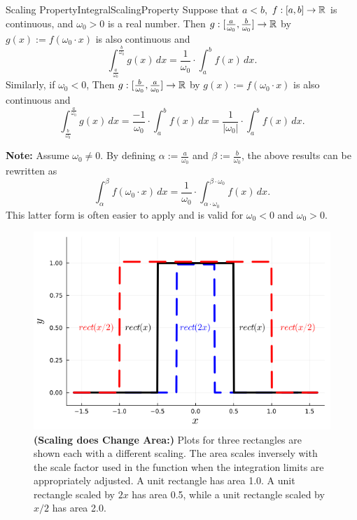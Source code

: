 \begin{propColor}{Scaling Property}{IntegralScalingProperty}
Suppose that $a < b$, $f:[a, b] \to \mathbb R$ is continuous, and $\omega_0 > 0$ is a real number.  Then $g:[\frac{a}{\omega_0}, \frac{b}{\omega_0}] \to \mathbb R$ by $g(x):=f(\omega_0 \cdot x)$ is also continuous and
\begin{equation}
\int_{\frac{a}{\omega_0}}^{\frac{b}{\omega_0}} g(x)\, dx = \frac{1}{\omega_0} \cdot \int_a^b f(x)\, dx.
\end{equation}
Similarly, if $\omega_0 <0$,
Then $g:[\frac{b}{\omega_0}, \frac{a}{\omega_0}] \to \mathbb R$ by $g(x):=f(\omega_0 \cdot x)$ is also continuous and
\begin{equation}
\int_{\frac{b}{\omega_0}}^{\frac{a}{\omega_0}} g(x)\, dx = \frac{-1}{\omega_0} \cdot \int_a^b f(x)\, dx = \frac{1}{|\omega_0|} \cdot \int_a^b f(x)\, dx.
\end{equation}

\textbf{Note:} Assume $\omega_0 \neq 0$. By defining $\alpha:=\frac{a}{\omega_0}$ and $\beta:=\frac{b}{\omega_0}$, the above results can be rewritten as 
\begin{equation}
\boxed{\int_{\alpha}^{\beta} f(\omega_0 \cdot x)\, dx = \frac{1}{\omega_0} \cdot \int_{\alpha \cdot \omega_0}^{\beta\cdot \omega_0} f(x)\, dx.}
\end{equation}
This latter form is often easier to apply and is valid for $\omega_0<0$ and $\omega_0>0$. 
\end{propColor}

\begin{figure}[htb]%
\centering
\includegraphics[width=0.6\columnwidth]{graphics/Chap03/IntegratingScaledRectangle.png}
    \caption[]{
    \textbf{(Scaling does Change Area:)} Plots for three rectangles are shown each with a different scaling. The area scales inversely with the scale factor used in the function when the integration limits are appropriately adjusted. A unit rectangle has area 1.0. A unit rectangle scaled by $2x$ has area 0.5, while a unit rectangle scaled by $x/2$ has area 2.0. }
    \label{fig:ScalingAndIntegration}
\end{figure}


